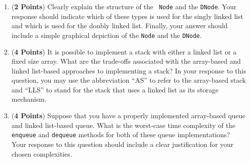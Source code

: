 \documentclass[12pt]{article}
\begin{document}
\begin{enumerate}
\begin{enumerate}

          \item ({\bf 2 Points}) Clearly explain the structure of the {\tt
              Node} and the {\tt DNode}.  Your response should indicate which of
            these types is used for the singly linked list and which is used
            for the doubly linked list.  Finally, your answer should include a
            simple graphical depiction of the {\tt Node} and the {\tt DNode}.


          \item ({\bf 4 Points}) It is possible to implement a stack with
            either a linked list or a fixed size array.  What are the
            trade-offs associated with the array-based and linked list-based
            approaches to implementing a stack?  In your response to this
            question, you may use the abbreviation ``AS'' to refer to the
            array-based stack and ``LLS'' to stand for the stack that uses a
            linked list as its storage mechanism.

          \item ({\bf 4 Points}) Suppose that you have a properly implemented
            array-based queue and linked list-based queue.  What is the
            worst-case time complexity of the {\tt enqueue} and {\tt dequeue}
            methods for both of these queue implementations?  Your response to
            this question should include a clear justification for your chosen
            complexities.



\end{enumerate}
\end{enumerate}
\end{document}
